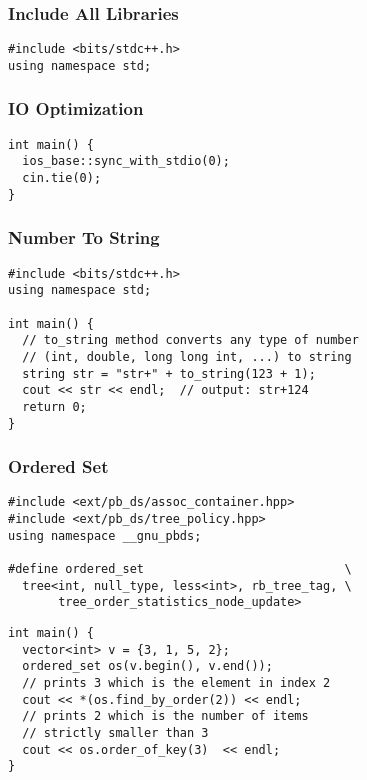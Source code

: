 \documentclass[twoside]{article}
\newcommand{\fileTitleStyle}{\large\underline}
\begin{document}
\begin{multicols*}{2}
\subsubsectionfont{\centering\bfseries\Large}
\subsubsectionfont{\fileTitleStyle}
\subsubsection*{Include All Libraries}
\begin{verbatim}
#include <bits/stdc++.h>
using namespace std;
\end{verbatim}

\subsubsectionfont{\centering\bfseries\Large}
\subsubsectionfont{\fileTitleStyle}
\subsubsection*{IO Optimization}
\begin{verbatim}
int main() {
  ios_base::sync_with_stdio(0);
  cin.tie(0);
}
\end{verbatim}

\subsubsectionfont{\centering\bfseries\Large}
\subsubsectionfont{\fileTitleStyle}
\subsubsection*{Number To String}
\begin{verbatim}
#include <bits/stdc++.h>
using namespace std;

int main() {
  // to_string method converts any type of number
  // (int, double, long long int, ...) to string
  string str = "str+" + to_string(123 + 1);
  cout << str << endl;  // output: str+124
  return 0;
}
\end{verbatim}

\subsubsectionfont{\centering\bfseries\Large}
\subsubsectionfont{\fileTitleStyle}
\subsubsection*{Ordered Set}
\begin{verbatim}
#include <ext/pb_ds/assoc_container.hpp>
#include <ext/pb_ds/tree_policy.hpp>
using namespace __gnu_pbds;

#define ordered_set                            \
  tree<int, null_type, less<int>, rb_tree_tag, \
       tree_order_statistics_node_update>
\end{verbatim}
\vspace{-12pt}
\begin{verbatim}
int main() {
  vector<int> v = {3, 1, 5, 2};
  ordered_set os(v.begin(), v.end());
  // prints 3 which is the element in index 2
  cout << *(os.find_by_order(2)) << endl;
  // prints 2 which is the number of items
  // strictly smaller than 3
  cout << os.order_of_key(3)  << endl;
}
\end{verbatim}


\end{multicols*}
\end{document}
